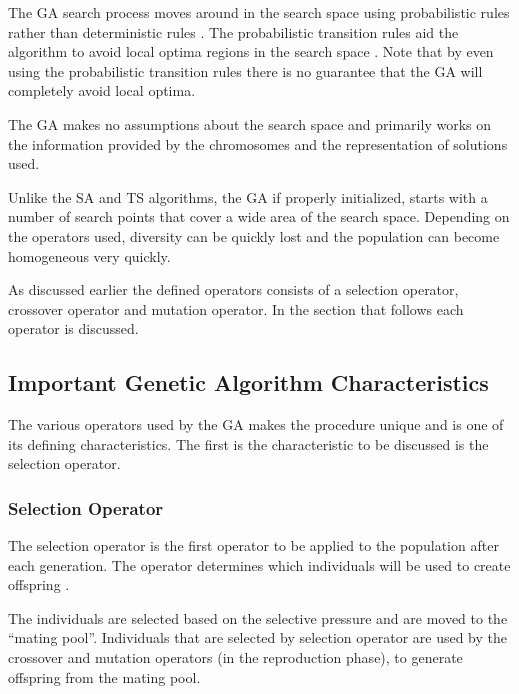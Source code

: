 The \gls{GA} search process moves around in the search space using probabilistic rules rather than deterministic rules \cite{FamilyGA}. The probabilistic transition rules aid the algorithm to avoid local optima regions in the search space \cite{HybridIntelliGA}. Note that by even using the probabilistic transition rules there is no guarantee that the \gls{GA} will completely avoid local optima\cite{CompuIntelligenceIntro}.

The \gls{GA} makes no assumptions about the search space and primarily works on the information provided by the chromosomes and the representation of solutions used\cite{CompuIntelligenceIntro,ConstrainedGA,HybridIntelliGA}. 

Unlike the \gls{SA} and \gls{TS} algorithms, the \gls{GA} if properly initialized, starts with a number of search points that cover a wide area of the search space. Depending on the operators used, diversity can be quickly lost and the population can become homogeneous very quickly\cite{DistributedHierarchicalGA,FamilyGA,HybridIntelliGA}\label{GASearchPoints}.

As discussed earlier the defined operators consists of a selection operator, crossover operator and mutation operator\cite{SelfAdaptiveGA,MultiPopGA}. In the section that follows each operator is discussed.

\subsection{Important Genetic Algorithm Characteristics}
The various operators used by the \gls{GA} makes the procedure unique and is one of its defining characteristics. The first is the characteristic to be discussed is the selection operator.

\subsubsection{Selection Operator}
The selection operator is the first operator to be applied to the population after each generation. The operator determines which individuals will be used to create offspring \cite{CoactiveFuzzyGA,CombinedBranchBoundGA,ConstrainedGA}.

The individuals are selected based on the selective pressure and are moved to the ``mating pool''. Individuals that are selected by selection operator are used by the crossover and mutation operators (in the reproduction phase), to generate offspring from the mating pool\cite{AdaptiveSAGA,AcceleratingGA}.

